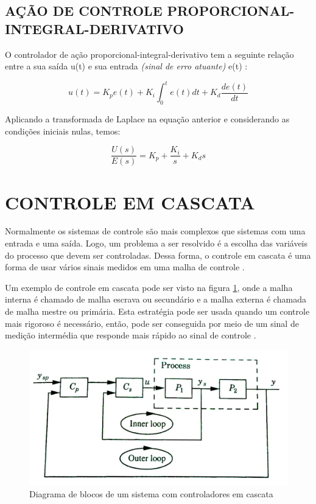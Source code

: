 \documentclass[12pt,oneside,a4paper, chapter=TITLE, section = TITLE, english, brazil]{abntex2}
\begin{document}
\subsection{AÇÃO DE CONTROLE PROPORCIONAL-INTEGRAL-DERIVATIVO} %

O controlador de ação proporcional-integral-derivativo tem a seguinte relação entre a sua saída u(t) e sua entrada \textit{(sinal de erro atuante)} e(t) \cite{ogata}:

$$u(t) = K_{p}e(t) + K_{i} \int^{t}_0 e(t)dt + K_{d}\frac{de(t)}{dt}$$

Aplicando a transformada de Laplace na equação anterior e considerando as condições iniciais nulas, temos:

\begin{equation}
\frac{U(s)}{E(s)} = K_{p} + \frac{K_{i}}{s} + K_{d}s \label{eq:g_s_cont_prop_integ_deriv}
\end{equation}

\section{CONTROLE EM CASCATA}

Normalmente os sistemas de controle são mais complexos que sistemas com uma entrada e uma saída. Logo, um problema a ser resolvido é a escolha das variáveis do processo que devem ser controladas. Dessa forma, o controle em cascata é uma forma de usar vários sinais medidos em uma malha de controle \cite{astrom}.

Um exemplo de controle em cascata pode ser visto na figura \ref{fig:cont_cascata}, onde a malha interna é chamado de malha escrava ou secundário e a malha externa é chamada de malha mestre ou primária. Esta estratégia pode ser usada quando um controle mais rigoroso é necessário, então, pode ser conseguida por meio de um sinal de medição intermédia que responde mais rápido ao sinal de controle \cite{astrom}.

\begin{figure}[h] %
\centering
\includegraphics[scale=0.32]{./imagens/cont_casct}
\caption[Diagrama de blocos de um sistema com controladores em cascata]{Diagrama de blocos de um sistema com controladores em cascata \cite{astrom}}
\label{fig:cont_cascata}
\end{figure}
\end{document}

